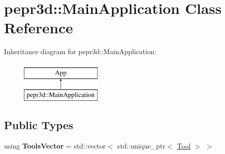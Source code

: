 \hypertarget{classpepr3d_1_1_main_application}{}\section{pepr3d\+::Main\+Application Class Reference}
\label{classpepr3d_1_1_main_application}
Inheritance diagram for pepr3d\+::Main\+Application\+:\begin{figure}[H]
\begin{center}
\leavevmode
\includegraphics[height=2.000000cm]{classpepr3d_1_1_main_application}
\end{center}
\end{figure}
\subsection*{Public Types}
\begin{DoxyCompactItemize}
\item 
\mbox{\label{classpepr3d_1_1_main_application_a99845ed56d376246abd66dd2ac04e25b}} 
using {\bfseries Tools\+Vector} = std\+::vector$<$ std\+::unique\+\_\+ptr$<$ \mbox{\hyperlink{classpepr3d_1_1_tool}{Tool}} $>$ $>$
\end{DoxyCompactItemize}

